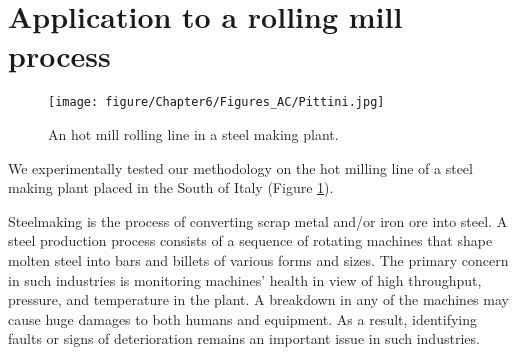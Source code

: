 


\section{Application to a rolling mill process}\label{sec:application}

\begin{figure}[ht]
    \centering
    \texttt{[image: figure/Chapter6/Figures\_AC/Pittini.jpg]}
    \caption{An hot mill rolling line in a steel making plant.}
    \label{fig_Pittini}
\end{figure}
We experimentally tested our  methodology on the hot milling line of a steel making plant placed in the South of Italy (Figure \ref{fig_Pittini}). 
%

Steelmaking is the process of converting scrap metal and/or iron ore into steel. A steel production process consists of a sequence of rotating machines that shape molten steel into bars and billets of various forms and sizes. The primary concern in such industries is monitoring machines' health in view of high throughput, pressure, and temperature in the plant. A breakdown in any of the machines may cause huge damages to both humans and equipment. As a result, identifying faults or signs of deterioration remains an important issue in such industries.

